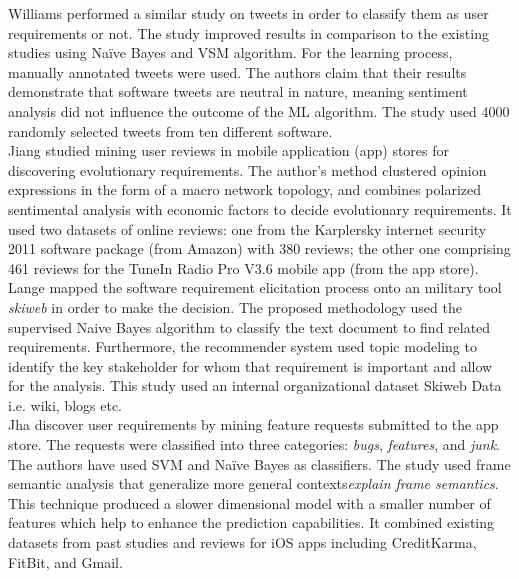 Williams \etal \cite{Williams:2017} performed a similar study on tweets in order
to classify them as user requirements or not. The study improved results in
comparison to the existing studies using Naïve Bayes and VSM algorithm.  For the learning
process, manually annotated tweets were used. The authors claim that their results demonstrate that
software tweets are neutral in nature, meaning sentiment analysis did not
influence the outcome of the ML algorithm.
The study used 4000 randomly selected tweets from ten different
software.\\

Jiang \etal \cite{Jiang:2014} studied mining user reviews in mobile application
(app) stores for discovering evolutionary requirements. The author's method
clustered opinion expressions in the form of a macro network
topology, and combines polarized
sentimental analysis with economic factors to decide evolutionary
requirements. It used two datasets of online reviews: one from the
Karplersky internet security 2011 software package (from Amazon) with 380
reviews; the other one  comprising 461 reviews for the  TuneIn Radio Pro V3.6
mobile app (from the app store).\\

Lange \etal\cite{Douglas:S2008} mapped the software requirement elicitation
process onto an military tool \emph{skiweb} in order to make the
decision. The proposed methodology used the supervised
Naive Bayes algorithm to classify the text document to find related
requirements. Furthermore, the recommender
system used topic modeling to identify the key
stakeholder for whom that requirement is important and allow for the
analysis. This study used an internal organizational
dataset Skiweb Data i.e. wiki, blogs etc.\\

Jha \etal \cite{Jha:2017} discover user requirements by mining feature requests
submitted to the app store. The requests were classified into three categories:
\emph{bugs}, \emph{features}, and \emph{junk}. The authors have used SVM and
Naïve Bayes as classifiers. The study used frame semantic analysis that
generalize more general contexts\emph{explain frame semantics}. This technique
produced a slower dimensional model with a smaller number of
features which help to enhance the prediction capabilities. It combined existing
datasets from past studies and reviews for iOS apps including CreditKarma,
FitBit, and Gmail.

